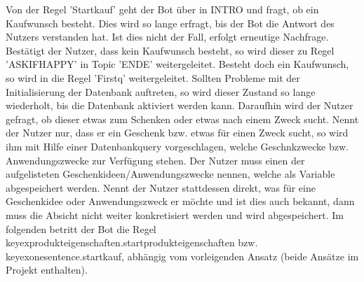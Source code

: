 Von der Regel 'Startkauf' geht der Bot über in INTRO und fragt, ob ein Kaufwunsch besteht. Dies wird so lange erfragt, bis der Bot die Antwort des Nutzers verstanden hat. 
Ist dies nicht der Fall, erfolgt erneutige Nachfrage. Bestätigt der Nutzer, dass kein Kaufwunsch besteht, so wird dieser zu Regel 'ASKIFHAPPY' in Topic 'ENDE' weitergeleitet. Besteht doch ein Kaufwunsch, so wird in die Regel 'Firstq' weitergeleitet. Sollten Probleme mit der Initialisierung der Datenbank auftreten, so wird dieser Zustand so lange wiederholt, bis die Datenbank aktiviert werden kann. 
Daraufhin wird der Nutzer gefragt, ob dieser etwas zum Schenken oder etwas nach einem Zweck sucht. Nennt der Nutzer nur, dass er ein Geschenk bzw. etwas für einen Zweck sucht, so wird ihm mit Hilfe einer Datenbankquery vorgeschlagen, welche Geschnkzwecke bzw. Anwendungszwecke zur Verfügung stehen. Der Nutzer muss einen der aufgelisteten Geschenkideen/Anwendungszwecke nennen, welche als Variable abgespeichert werden. Nennt der Nutzer stattdessen direkt, was für eine Geschenkidee oder Anwendungszweck er möchte und ist dies auch bekannt, dann muss die Absicht nicht weiter konkretisiert werden und wird abgespeichert. 
Im folgenden betritt der Bot die Regel keyexprodukteigenschaften.startprodukteigenschaften bzw. keyexonesentence.startkauf, abhängig vom vorleigenden Ansatz (beide Ansätze im Projekt enthalten). 

